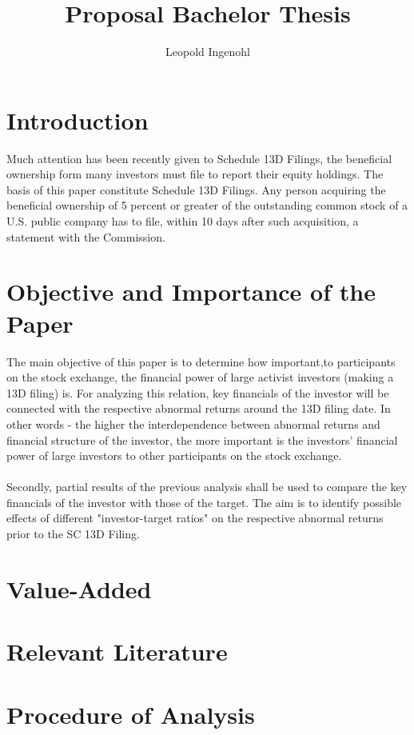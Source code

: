 \documentclass[a4paper,12pt]{article}
\title{Proposal Bachelor Thesis}
\author{Leopold Ingenohl}
\begin{document}
\maketitle

\section{Introduction}
Much attention has been recently given to Schedule 13D Filings, the beneficial ownership form many investors must file to report their equity holdings. The basis of this paper constitute Schedule 13D Filings. Any person acquiring the beneficial ownership of 5 percent or greater of the outstanding common stock of a U.S. public company has to file, within 10 days after such acquisition, a statement with the Commission.

\section{Objective and Importance of the Paper}
The main objective of this paper is to determine how important,to participants on the stock exchange, the financial power of large activist investors (making a 13D filing) is. For analyzing this relation, key financials of the investor will be connected with the respective abnormal returns around the 13D filing date. In other words - the higher the interdependence between abnormal returns and financial structure of the investor, the more important is the investors' financial power of large investors to other participants on the stock exchange.\\
\\
Secondly, partial results of the previous analysis shall be used to compare the key financials of the investor with those of the target. The aim is to identify possible effects of different "investor-target ratios" on the respective abnormal returns prior to the SC 13D Filing. 

\section{Value-Added}

\section{Relevant Literature}

\section{Procedure of Analysis}
\end{document}
